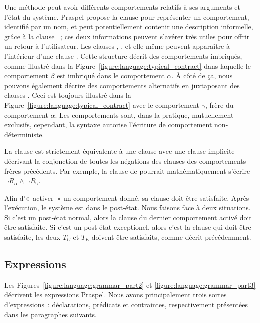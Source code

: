 Une méthode peut avoir différents {\strong comportements} relatifs à ses
arguments et l'état du système. Praspel propose la clause \abehavior pour
représenter un comportement, identifié par un nom, et peut potentiellement
contenir une description informelle, grâce à la clause \adescription~; ces deux
informations peuvent s'avérer très utiles pour offrir un retour à l'utilisateur.
Les clauses \arequires, \aensures, \athrowable et \abehavior elle-même peuvent
apparaître à l'intérieur d'une clause \abehavior. Cette structure décrit des
comportements {\strong imbriqués}, comme illustré dans la
Figure~\ref{figure:language:typical_contract} dans laquelle le comportement
$\beta$ est imbriqué dans le comportement $\alpha$. À côté de ça, nous pouvons
également décrire des comportements {\strong alternatifs} en juxtaposant des
clauses \abehavior. Ceci est toujours illustré dans la
Figure~\ref{figure:language:typical_contract} avec le comportement $\gamma$,
frère du comportement $\alpha$. Les comportements sont, dans la pratique,
{\strong mutuellement exclusifs}, cependant, la syntaxe autorise l'écriture de
comportement non-déterministe.

La clause \adefault est strictement équivalente à une clause
\abehavior avec une clause \arequires implicite décrivant la conjonction de
toutes les négations des clauses \arequires des comportements frères précédents.
Par exemple, la clause \arequires de \adefault pourrait mathématiquement
s'écrire $\neg R_\alpha \land \neg R_\gamma$.

Afin d'«~activer~» un comportement donné, sa clause \arequires doit être
satisfaite. Après l'exécution, le système est dans le post-état. Nous faisons
face à deux situations. Si c'est un post-état normal, alors la clause \aensures
du dernier comportement activé doit être satisfaite. Si c'est un post-état
exceptionel, alors c'est la clause \athrowable qui doit être satisfaite, \ie les
deux $T_C$ et $T_E$ doivent être satisfaits, comme décrit précédemment.

\subsection{Expressions}
\label{subsection:language:expressions}

Les Figures~\ref{figure:language:grammar_part2} et
\ref{figure:language:grammar_part3} décrivent les expressions Praspel. Nous
avons principalement trois sortes d'expressions~: déclarations, prédicats et
contraintes, respectivement présentées dans les paragraphes suivants.

